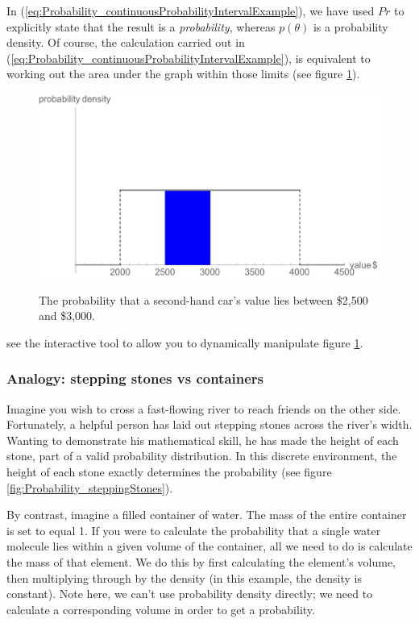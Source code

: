 \documentclass[11pt,fullpage]{book}
\begin{document}
In (\ref{eq:Probability_continuousProbabilityIntervalExample}), we have used $Pr$ to explicitly state that the result is a \textit{probability}, whereas $p(\theta)$ is a probability density. Of course, the calculation carried out in (\ref{eq:Probability_continuousProbabilityIntervalExample}), is equivalent to working out the area under the graph within those limits (see figure \ref{fig:Probability_continuousLotteryInterval}).

\begin{figure}
\centering
\scalebox{0.5} 
{\includegraphics{Probability_continuousLotteryInterval.pdf}}
\caption{The probability that a second-hand car's value lies between \$2,500 and \$3,000.}\label{fig:Probability_continuousLotteryInterval}
\end{figure}

 see the interactive tool to allow you to dynamically manipulate figure \ref{fig:Probability_continuousLotteryInterval}.

\subsubsection{Analogy: stepping stones vs containers}
Imagine you wish to cross a fast-flowing river to reach friends on the other side. Fortunately, a helpful person has laid out stepping stones across the river's width. Wanting to demonstrate his mathematical skill, he has made the height of each stone, part of a valid probability distribution. In this discrete environment, the height of each stone exactly determines the probability (see figure \ref{fig:Probability_steppingStones}). 

By contrast, imagine a filled container of water. The mass of the entire container is set to equal 1. If you were to calculate the probability that a single water molecule lies within a given volume of the container, all we need to do is calculate the mass of that element. We do this by first calculating the element's volume, then multiplying through by the density (in this example, the density is constant). Note here, we can't use probability density directly; we need to calculate a corresponding volume in order to get a probability.
\end{document}
